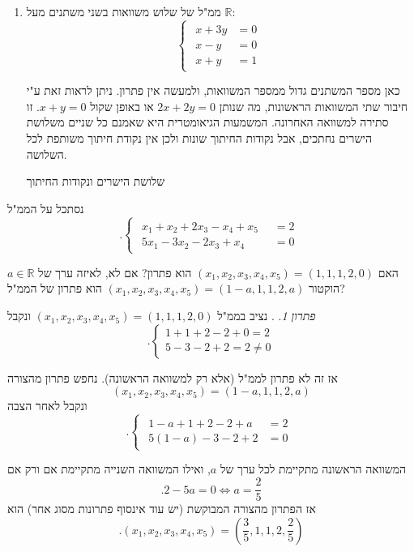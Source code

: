 \documentclass[
  hebrew,
  12pt,
  a4paper,
  oneside]{book}
\theoremstyle{definition}
\theoremstyle{remark}
\theoremstyle{plain}
\theoremstyle{remark}
\newtheorem*{solution}{פתרון}
\begin{document}
\begin{example}
\begin{enumerate}
  ניתן לבדוק ע"י הצבה כי \((z_1,z_2,z_3,z_4)=(1,0,1,0)\) הוא פתרון של
  הממ"ל. אינטואיטיבית, אמורים להיות אינסוף פתרונות כי מספר המשתנים גדול
  ממספר המשוואות. נצדיק את האינטואיציה הזו בהמשך.
\item
  ממ"ל של שלוש משוואות בשני משתנים מעל \(\mathbb R\): \[\begin{cases}
  \begin{aligned}
  x+3y&=0\\
  x-y&=0\\
  x+y&=1
  \end{aligned}
  \end{cases}\]

  כאן מספר המשתנים גדול ממספר המשוואות, ולמעשה אין פתרון. ניתן לראות זאת
  ע"י חיבור שתי המשוואות הראשונות, מה שנותן \(2x+2y=0\) או באופן שקול
  \(x+y=0\). זו סתירה למשוואה האחרונה. המשמעות הגיאומטרית היא שאמנם כל
  שניים משלושת הישרים נחתכים, אבל נקודות החיתוך שונות ולכן אין נקודת
  חיתוך משותפת לכל השלושה.

  שלושת הישרים ונקודות החיתוך
\end{enumerate}

\end{example}

\begin{exercise}

נסתכל על הממ"ל \[.\begin{cases}
\begin{aligned}
x_1 +  x_2 + 2x_3 - x_4+x_5 &= 2 \\[4pt]
5x_1 - 3x_2 - 2x_3 + x_4\phantom{+x_5} &= 0
\end{aligned}
\end{cases}\]

האם \((x_1,x_2,x_3,x_4,x_5)=(1,1,1,2,0)\) הוא פתרון? אם לא, לאיזה ערך של
\(a\in\mathbb R\) הוקטור \((x_1,x_2,x_3,x_4,x_5)=(1-a,1,1,2,a)\) הוא
פתרון של הממ"ל?

\end{exercise}

\begin{solution}
. נציב בממ"ל \((x_1,x_2,x_3,x_4,x_5)=(1,1,1,2,0)\) ונקבל
\[.\begin{cases}
1+1+2-2+0=2 \\
5-3-2+2=2\neq 0
\end{cases}\]

אז זה לא פתרון לממ"ל (אלא רק למשוואה הראשונה). נחפש פתרון מהצורה
\[(x_1,x_2,x_3,x_4,x_5)=(1-a,1,1,2,a)\] ונקבל לאחר הצבה \[.\begin{cases}
\begin{aligned}
1-a+1+2-2+a&=2 \\
5(1-a)-3-2+2&=0
\end{aligned}
\end{cases}\]

המשוואה הראשונה מתקיימת לכל ערך של \(a\), ואילו המשוואה השנייה מתקיימת
אם ורק אם \[.2-5a=0 \iff a=\frac{2}{5}\] אז הפתרון מהצורה המבוקשת (יש
עוד אינסוף פתרונות מסוג אחר) הוא
\[.(x_1,x_2,x_3,x_4,x_5)=(\frac{3}{5},1,1,2,\frac{2}{5})\]
\end{solution}
\end{document}
